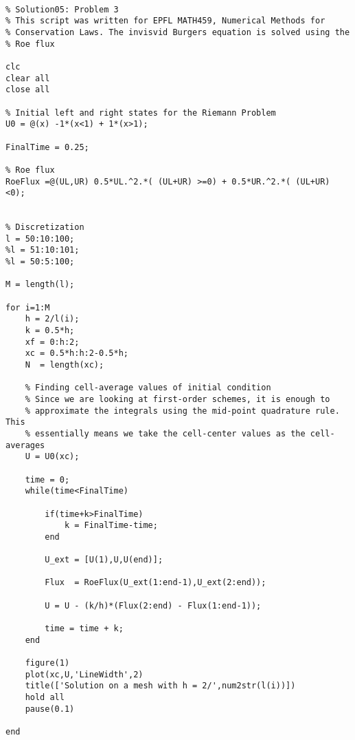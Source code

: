 \documentclass[10pt,letterpaper]{article}
\theoremstyle{break}
\begin{document}

\newpage
\begin{lstlisting}

% Solution05: Problem 3
% This script was written for EPFL MATH459, Numerical Methods for
% Conservation Laws. The invisvid Burgers equation is solved using the
% Roe flux

clc
clear all
close all

% Initial left and right states for the Riemann Problem
U0 = @(x) -1*(x<1) + 1*(x>1);

FinalTime = 0.25;

% Roe flux
RoeFlux =@(UL,UR) 0.5*UL.^2.*( (UL+UR) >=0) + 0.5*UR.^2.*( (UL+UR) <0);


% Discretization
l = 50:10:100;
%l = 51:10:101;
%l = 50:5:100;

M = length(l);

for i=1:M
    h = 2/l(i);
    k = 0.5*h;
    xf = 0:h:2;
    xc = 0.5*h:h:2-0.5*h;
    N  = length(xc);
    
    % Finding cell-average values of initial condition
    % Since we are looking at first-order schemes, it is enough to
    % approximate the integrals using the mid-point quadrature rule. This
    % essentially means we take the cell-center values as the cell-averages
    U = U0(xc);
    
    time = 0;
    while(time<FinalTime)
        
        if(time+k>FinalTime)
            k = FinalTime-time;
        end
        
        U_ext = [U(1),U,U(end)];
        
        Flux  = RoeFlux(U_ext(1:end-1),U_ext(2:end));
        
        U = U - (k/h)*(Flux(2:end) - Flux(1:end-1));
        
        time = time + k;
    end
    
    figure(1)
    plot(xc,U,'LineWidth',2)
    title(['Solution on a mesh with h = 2/',num2str(l(i))])
    hold all
    pause(0.1)
    
end




\end{lstlisting}
\end{document}
